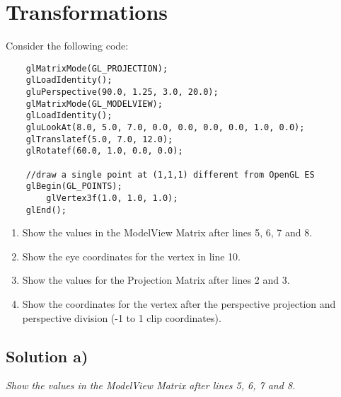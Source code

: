 \documentclass[12pt,fleqn,reqno]{article}
\begin{document}
\section{Transformations}
Consider the following code:
\begin{lstlisting}
	glMatrixMode(GL_PROJECTION);
  	glLoadIdentity();
  	gluPerspective(90.0, 1.25, 3.0, 20.0);
  	glMatrixMode(GL_MODELVIEW);
  	glLoadIdentity();
  	gluLookAt(8.0, 5.0, 7.0, 0.0, 0.0, 0.0, 0.0, 1.0, 0.0);
  	glTranslatef(5.0, 7.0, 12.0);
  	glRotatef(60.0, 1.0, 0.0, 0.0);
  	
	//draw a single point at (1,1,1) different from OpenGL ES
 	glBegin(GL_POINTS);
    	glVertex3f(1.0, 1.0, 1.0);
 	glEnd();
\end{lstlisting}

\renewcommand{\labelenumi}{\alph{enumi})}
\begin{enumerate}
	\item{ Show the values in the ModelView Matrix after lines 5, 6, 7 and 8.}
	\item{ Show the eye coordinates for the vertex in line 10.}
	\item{ Show the values for the Projection Matrix after lines 2 and 3.}
	\item{ Show the coordinates for the vertex after the perspective projection and perspective division (-1 to 1 clip coordinates).}
\end{enumerate}

\subsection{Solution a)}
\emph{Show the values in the ModelView Matrix after lines 5, 6, 7 and 8.}
\end{document}
